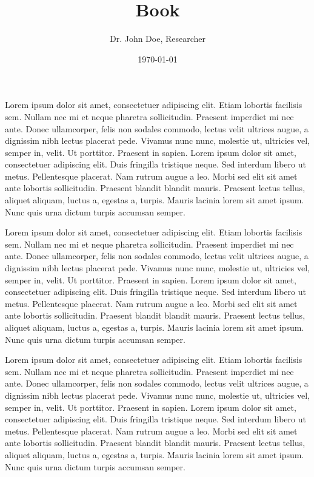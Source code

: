 \documentclass[typewriter]{bureau_po_report}
\author{Dr. John Doe, Researcher}
\date{1970-01-01}
\title{\censorbox{Ray Lasergunn} Book}
\begin{document}
\maketitle
\makeimage


Lorem ipsum dolor sit amet, consectetuer adipiscing elit. Etiam lobortis facilisis sem. Nullam nec
mi et neque pharetra sollicitudin. Praesent imperdiet mi nec ante. Donec ullamcorper, felis non
sodales commodo, lectus velit ultrices augue, a dignissim nibh lectus placerat pede. Vivamus nunc
nunc, molestie ut, ultricies vel, semper in, velit. Ut porttitor. Praesent in sapien. Lorem ipsum
dolor sit amet, consectetuer adipiscing elit. Duis fringilla tristique neque. Sed interdum libero
ut metus. Pellentesque placerat. Nam rutrum augue a leo. Morbi sed elit sit amet ante lobortis
sollicitudin. Praesent blandit blandit mauris. Praesent lectus tellus, aliquet aliquam, luctus a,
egestas a, turpis. Mauris lacinia lorem sit amet ipsum. Nunc quis urna dictum turpis accumsan
semper.


Lorem ipsum dolor sit amet, consectetuer adipiscing elit. Etiam lobortis facilisis sem. Nullam nec
mi et neque pharetra sollicitudin. Praesent imperdiet mi nec ante. Donec ullamcorper, felis non
sodales commodo, lectus velit ultrices augue, a dignissim nibh lectus placerat pede. Vivamus nunc
nunc, molestie ut, ultricies vel, semper in, velit. Ut porttitor. Praesent in sapien. Lorem ipsum
dolor sit amet, consectetuer adipiscing elit. Duis fringilla tristique neque. Sed interdum libero
ut metus. Pellentesque placerat. Nam rutrum augue a leo. Morbi sed elit sit amet ante lobortis
sollicitudin. Praesent blandit blandit mauris. Praesent lectus tellus, aliquet aliquam, luctus a,
egestas a, turpis. Mauris lacinia lorem sit amet ipsum. Nunc quis urna dictum turpis accumsan
semper.


Lorem ipsum dolor sit amet, consectetuer adipiscing elit. Etiam lobortis facilisis sem. Nullam nec
mi et neque pharetra sollicitudin. Praesent imperdiet mi nec ante. Donec ullamcorper, felis non
sodales commodo, lectus velit ultrices augue, a dignissim nibh lectus placerat pede. Vivamus nunc
nunc, molestie ut, ultricies vel, semper in, velit. Ut porttitor. Praesent in sapien. Lorem ipsum
dolor sit amet, consectetuer adipiscing elit. Duis fringilla tristique neque. Sed interdum libero
ut metus. Pellentesque placerat. Nam rutrum augue a leo. Morbi sed elit sit amet ante lobortis
sollicitudin. Praesent blandit blandit mauris. Praesent lectus tellus, aliquet aliquam, luctus a,
egestas a, turpis. Mauris lacinia lorem sit amet ipsum. Nunc quis urna dictum turpis accumsan
semper.
\end{document}
